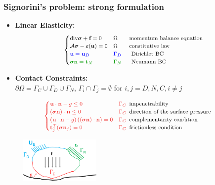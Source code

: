 \documentclass[8pt, oneside]{beamer}   	%
\newcommand{\bff}{\textbf{f}}
\newcommand{\bn}{\textbf{n}}
\newcommand{\bt}{\textbf{t}}
\newcommand{\bu}{\textbf{u}}
\newcommand{\bsigma}{\boldsymbol{\sigma}}
\newcommand{\colb}{\color{blue}}
\newcommand{\colg}{\color{mygreen}}
\newcommand{\colo}{\color{orange}}
\newcommand{\colk}{\color{black}}
\newcommand{\titlecolor}[1]{\frametitle{\textcolor{dkgrey}{ \textbf{#1}}}}
\begin{document}
\begin{frame}
\titlecolor{Signorini's problem: strong formulation}
\begin{itemize}
\item  \textbf{Linear Elasticity:}
\scriptsize
\begin{align*}
\colk
\footnotesize
\begin{cases}
\text{div} \bsigma + \bff=0 & \Omega  \qquad \colk{\text{momentum balance equation}}\\
\mathcal{A} \bsigma - \boldsymbol{\varepsilon}(\bu)=0 &\Omega \qquad \colk{\text{constitutive law}}\\
\colb \bu = \bu_D & \colb \Gamma_D\quad \:\:\: \colk{{\text{Dirichlet BC}}}\\
\colg \bsigma  \bn = \bt_N & \colg \Gamma_N\quad  \:\:\:\colk{{\text{Neumann BC}}}\\
\end{cases} \\
\end{align*}
\normalsize
\item { \textbf{Contact Constraints:} }\\
\scriptsize
\colk
$ \partial \Omega=\Gamma_C \cup  \Gamma_D \cup  \Gamma_N$, $\Gamma_i \cap  \Gamma_j =\emptyset$ for $i,j=D,N,C, i \neq j$
\end{itemize}
\begin{align*}\colo
\footnotesize
\begin{cases}
\bu \cdot \bn - g  \leq 0 \quad & \Gamma_C  \:\:  \colk{\text{impenetrability}}\\
(\bsigma \bn) \cdot \bn \leq 0 \quad & \Gamma_C  \:\:  \colk{\text{direction of the surface pressure}}\\
 \left(\bu \cdot \bn -g \right) \left( (\bsigma \bn) \cdot \bn \right) =0 &\Gamma_C  \:\:  \colk{\text{complementarity condition}}\\
  \bt_j^T(\bsigma \bn_j) =0  \quad & \Gamma_C  \:\: \colk{\text{frictionless condition}}
\end{cases}
\end{align*}
\begin{figure}[htbp!]
		\centering
	\includegraphics[width=0.35\textwidth]{img/contactproblem.pdf}\qquad

\end{figure}
\end{frame}
\end{document}
